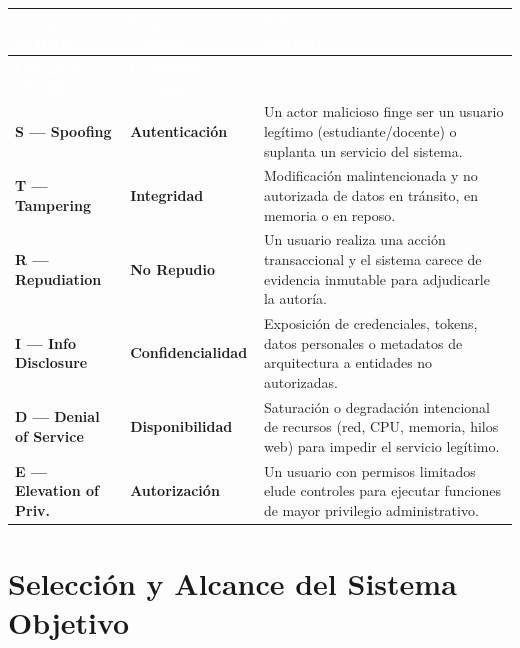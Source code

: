 \small
\begin{longtable}{>{\bfseries}p{2.8cm} >{\bfseries}p{2.6cm} p{9.0cm}}
\toprule
\rowcolor{fg}
\textcolor{white}{Categoría STRIDE} & \textcolor{white}{Propiedad Violada} & \textcolor{white}{Definición en el Contexto del Software} \\
\midrule
\endfirsthead
\toprule
\rowcolor{fg}
\textcolor{white}{Categoría STRIDE} & \textcolor{white}{Propiedad Violada} & \textcolor{white}{Definición en el Contexto del Software} \\
\midrule
\endhead
\bottomrule
\endfoot
S --- Spoofing & Autenticación & Un actor malicioso finge ser un usuario legítimo (estudiante/docente) o suplanta un servicio del sistema. \\
\midrule
T --- Tampering & Integridad & Modificación malintencionada y no autorizada de datos en tránsito, en memoria o en reposo. \\
\midrule
R --- Repudiation & No Repudio & Un usuario realiza una acción transaccional y el sistema carece de evidencia inmutable para adjudicarle la autoría. \\
\midrule
I --- Info Disclosure & Confidencialidad & Exposición de credenciales, tokens, datos personales o metadatos de arquitectura a entidades no autorizadas. \\
\midrule
D --- Denial of Service & Disponibilidad & Saturación o degradación intencional de recursos (red, CPU, memoria, hilos web) para impedir el servicio legítimo. \\
\midrule
E --- Elevation of Priv. & Autorización & Un usuario con permisos limitados elude controles para ejecutar funciones de mayor privilegio administrativo. \\
\bottomrule
\end{longtable}
\normalsize

\section{Selección y Alcance del Sistema Objetivo}

